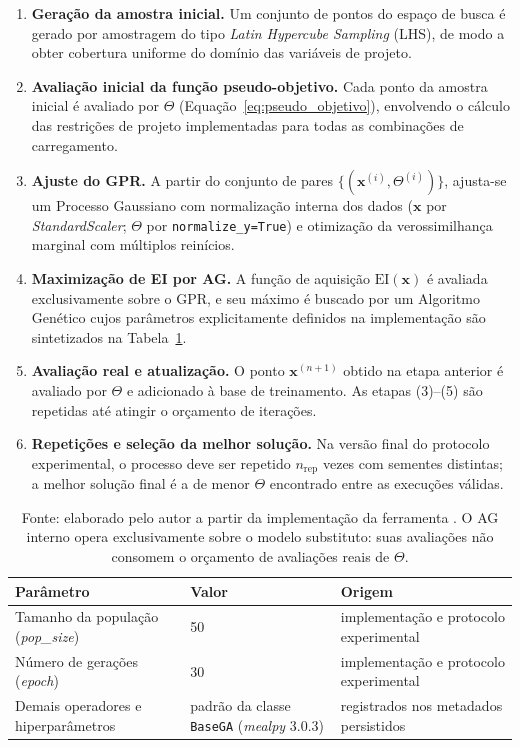 \begin{enumerate}
    \item \textbf{Geração da amostra inicial.} Um conjunto de pontos do espaço de busca é gerado por amostragem do tipo \textit{Latin Hypercube Sampling} (LHS), de modo a obter cobertura uniforme do domínio das variáveis de projeto.
    \item \textbf{Avaliação inicial da função pseudo-objetivo.} Cada ponto da amostra inicial é avaliado por $\Theta$ (Equação~\eqref{eq:pseudo_objetivo}), envolvendo o cálculo das restrições de projeto implementadas para todas as combinações de carregamento.
    \item \textbf{Ajuste do GPR.} A partir do conjunto de pares $\{(\bm{x}^{(i)}, \Theta^{(i)})\}$, ajusta-se um Processo Gaussiano com normalização interna dos dados ($\bm{x}$ por \textit{StandardScaler}; $\Theta$ por \texttt{normalize\_y=True}) e otimização da verossimilhança marginal com múltiplos reinícios.
    \item \textbf{Maximização de EI por AG.} A função de aquisição $\mathrm{EI}(\bm{x})$ é avaliada exclusivamente sobre o GPR, e seu máximo é buscado por um Algoritmo Genético cujos parâmetros explicitamente definidos na implementação são sintetizados na Tabela~\ref{tab:ag_params}.
    \item \textbf{Avaliação real e atualização.} O ponto $\bm{x}^{(n+1)}$ obtido na etapa anterior é avaliado por $\Theta$ e adicionado à base de treinamento. As etapas (3)--(5) são repetidas até atingir o orçamento de iterações.
    \item \textbf{Repetições e seleção da melhor solução.} Na versão final do protocolo experimental, o processo deve ser repetido $n_{\mathrm{rep}}$ vezes com sementes distintas; a melhor solução final é a de menor $\Theta$ encontrado entre as execuções válidas.
\end{enumerate}

\begin{table}[!t]
    \centering
    \caption{Parâmetros do Algoritmo Genético utilizado como otimizador interno da função de aquisição.}
    \label{tab:ag_params}
    \small
    \begin{tabular}{p{}p{}p{}}
        \toprule
        Parâmetro & Valor & Origem \\
        \midrule
        Tamanho da população (\textit{pop\_size}) & 50 & implementação e protocolo experimental \\
        Número de gerações (\textit{epoch}) & 30 & implementação e protocolo experimental \\
        Demais operadores e hiperparâmetros & padrão da classe \texttt{BaseGA} (\textit{mealpy} 3.0.3) & registrados nos metadados persistidos \\
        \bottomrule
    \end{tabular}
    \caption*{\footnotesize Fonte: elaborado pelo autor a partir da implementação da ferramenta \fundaai{}. O AG interno opera exclusivamente sobre o modelo substituto: suas avaliações não consomem o orçamento de avaliações reais de $\Theta$.}
\end{table}


